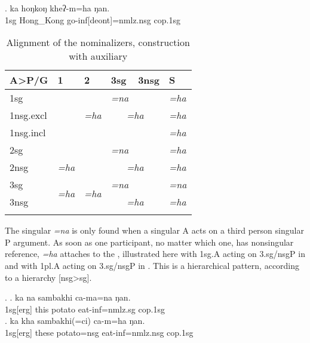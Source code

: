 \exg. ka hoŋkoŋ kheʔ-m=ha ŋan.\\
{\sc 1sg} Hong\_Kong go-{\sc inf[deont]=nmlz.nsg} {\sc cop.1sg}\\


\begin{table}[htp]
\begin{center}
\begin{tabular}{l|l|l|l|l|l}
\lsptoprule
{\bf A>P/G} 	&	1&2&{\sc 3sg}&{\sc 3nsg}&S\\
\hline
{\sc }1sg  		& \cellcolor[gray]{.8}&&\it =na &  &\it =ha \\
 \cline{4-4}
 {\sc 1nsg.excl}   &	\cellcolor[gray]{.8}&\it =ha 				&\multicolumn{2}{c|}{\it =ha}&\it =ha\\
\cline{3-3}
{\sc 1nsg.incl}   	&\multicolumn{2}{c|}{\cellcolor[gray]{.8}}		& \multicolumn{2}{c|}{}&\it =ha\\
\hline
{\sc 2sg}  		&    & \cellcolor[gray]{.8}	&\it =na& & \it =ha\\
\cline{4-4} 
{\sc 2nsg}  		& \it =ha  & \cellcolor[gray]{.8}	&\multicolumn{2}{c|}{\it =ha}&\it =ha\\
\hline
{\sc 3sg}  	& \multirow{2}{*}{\it =ha}&\multirow{2}{*}{\it =ha}&\it =na&&\it =na\\
\cline{4-4}
{\sc 3nsg} 	&	& 	&\multicolumn{2}{c|}{\it =ha}&\it =ha \\
\lspbottomrule
\end{tabular}
\caption{Alignment  of the nominalizers, construction with auxiliary}\label{nom-align}
\end{center}
\end{table}

The singular  \emph{=na} is only found when a singular A acts on a third person singular P argument. As soon as one participant, no matter which one, has nonsingular reference, \emph{=ha} attaches to the , illustrated here with {\sc 1sg.A} acting on {\sc 3.sg/nsgP} in \Next and with {\sc 1pl.A} acting on {\sc 3.sg/nsgP}  in \NNext. This is a hierarchical pattern, according to a  hierarchy [nsg>sg].

\ex. \ag. ka na sambakhi ca-ma=na ŋan.\\
{\sc 1sg[erg]} this potato eat-{\sc inf=nmlz.sg} {\sc cop.1sg}\\
\bg.  ka kha sambakhi(=ci) ca-m=ha ŋan.\\
{\sc 1sg[erg]} these potato{\sc =nsg} eat-{\sc inf=nmlz.nsg} {\sc cop.1sg}\\

